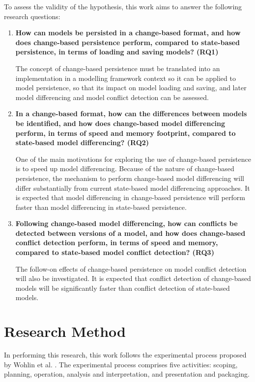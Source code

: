 To assess the validity of the hypothesis, this work aims to answer the following research questions:
\\
\begin{enumerate}
  \item \textbf{How can models be persisted in a change-based format, and how does change-based persistence perform, compared to state-based persistence, in terms of loading and saving models? (RQ1)}
  
  The concept of change-based persistence must be translated into an implementation in a modelling framework context so it can be applied to model persistence, so that its impact on model loading and saving, and later model differencing and model conflict detection can be assessed.
  
  \item \textbf{In a change-based format, how can the differences between models be identified, and how does change-based model differencing perform, in terms of speed and memory footprint, compared to state-based model differencing? (RQ2)}
  
  One of the main motivations for exploring the use of change-based persistence is to speed up model differencing. Because of the nature of change-based persistence, the mechanism to perform change-based model differencing will differ substantially from current state-based model differencing approaches. It is expected that model differencing in change-based persistence will perform faster than model differencing in state-based persistence.
  
  \item \textbf{Following change-based model differencing, how can conflicts be detected between versions of a model, and how does change-based conflict detection perform, in terms of speed and memory, compared to state-based model conflict detection? (RQ3)}
  
  The follow-on effects of change-based persistence on model conflict detection will also be investigated. It is expected that conflict detection of change-based models will be significantly faster than conflict detection of state-based models.
\end{enumerate}

\section{Research Method}
\label{sec:research_method}
In performing this research, this work follows the experimental process proposed by Wohlin et al. \cite{DBLP:books/daglib/0029933/Wohlin}. The experimental process comprises five activities: scoping, planning, operation, analysis and interpretation, and presentation and packaging.

